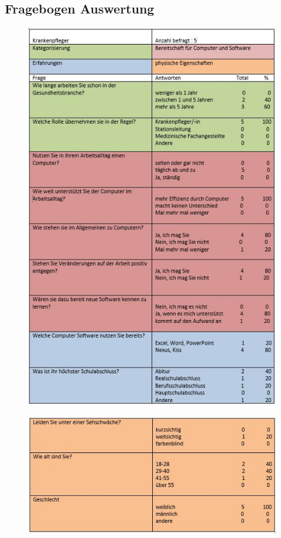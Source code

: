 \documentclass[11pt,
paper=a4,
bibtotocnumbered,	  %
liststotocnumbered,  %
DIV=calc,		  %
tablecaptionabove,	  %
headinclude,
]{article}
\begin{document}
\subsection{Fragebogen Auswertung}
\begin{figure}[H]
\includegraphics[width=1\textwidth]{Bilder/ausw1.jpg}
\end{figure}
\begin{figure}[H]
\includegraphics[width=1\textwidth]{Bilder/ausw2.jpg}
\end{figure}
\end{document}
